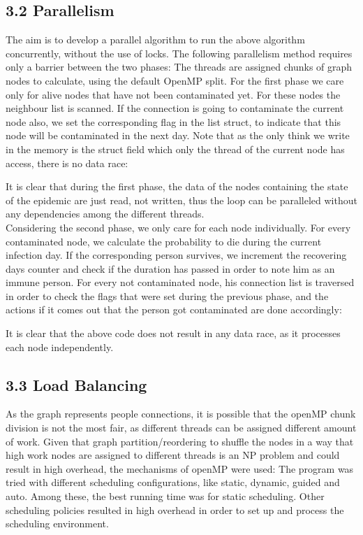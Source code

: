 \documentclass{article}
\begin{document}
\subsection*{3.2 Parallelism}
The aim is to develop a parallel algorithm to run the above algorithm concurrently, without the use of locks. The following parallelism method requires only a barrier between the two phases: The threads are assigned chunks of graph nodes to calculate, using the default OpenMP split. For the first phase we care only for alive nodes that have not been contaminated yet. For these nodes the neighbour list is scanned.  If the connection is going to contaminate the current node also, we set the corresponding flag in the list struct, to indicate that this node will be contaminated in the next day. Note that as the only think we write in the memory is the struct field which only the thread of the current node has access, there is no data race:
\pagebreak

It is clear that during the first phase, the data of the nodes containing the state of the epidemic are just read, not written, thus the loop can be paralleled without any dependencies among the different threads. \\
Considering the second phase, we only care for each node individually. For every contaminated node, we calculate the probability to die during the current infection day. If the corresponding person survives, we increment the recovering days counter and check if the duration has passed in order to note him as an immune person. For every not contaminated node, his connection list is traversed in order to check the flags that were set during the previous phase, and the actions if it comes out that the person got contaminated are done accordingly:

It is clear that the above code does not result in any data race, as it processes each node independently.

\subsection*{3.3 Load Balancing}
As the graph represents people connections, it is possible that the openMP chunk division is not the most fair, as different threads can be assigned different amount of work. Given that graph partition/reordering to shuffle the nodes in a way that high work nodes are assigned to different threads is an NP problem and could result in high overhead, the mechanisms of openMP were used: The program was tried with different scheduling configurations, like static, dynamic, guided and auto. Among these, the best running time was for static scheduling. Other scheduling policies resulted in high overhead in order to set up and process the scheduling environment.
\end{document}
